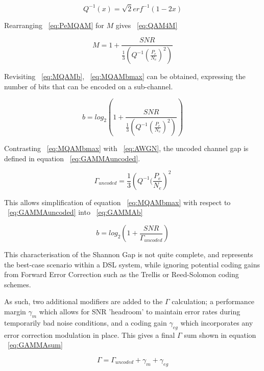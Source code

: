 \begin{equation}\label{eq:QxQAMerf2}
Q^{-1}(x)=\sqrt{2} erf^{-1}(1-2x)
\end{equation}

Rearranging ~\eqref{eq:PeMQAM} for \(M\) gives ~\eqref{eq:QAM4M}

\begin{equation}\label{eq:QAM4M}
M=1+\frac{SNR}{\frac{1}{3}(Q^{-1}(\frac{P_e}{N_e})^2)}
\end{equation}

Revisiting ~\eqref{eq:MQAMb}, ~\eqref{eq:MQAMbmax} can be obtained, expressing the number of bits that can be encoded on a sub-channel.

\begin{equation}\label{eq:MQAMbmax}
b=log_2\left(1+\frac{SNR}{\frac{1}{3}(Q^{-1}(\frac{P_e}{N_e})^2)}\right)
\end{equation}

Contrasting ~\eqref{eq:MQAMbmax} with ~\eqref{eq:AWGN}, the uncoded channel gap is defined in equation ~\eqref{eq:GAMMAuncoded}.

\begin{equation}\label{eq:GAMMAuncoded}
\Gamma_{uncoded}=\frac{1}{3}\left(Q^{-1}(\frac{P_e}{N_e}\right)^2
\end{equation}

This allows simplification of equation ~\eqref{eq:MQAMbmax} with respect to ~\eqref{eq:GAMMAuncoded} into ~\eqref{eq:GAMMAb}

\begin{equation}\label{eq:GAMMAb}
b=log_2\left(1+\frac{SNR}{\Gamma_{uncoded}}\right)
\end{equation}

This characterisation of the Shannon Gap is not quite complete, and represents the best-case scenario within a DSL system, while ignoring potential coding gains from Forward Error Correction such as the Trellis\cite{GU82} or Reed-Solomon\cite{Ree59} coding schemes.

As such, two additional modifiers are added to the \(\Gamma\) calculation; a performance margin \(\gamma_m\) which allows for SNR 'headroom' to maintain error rates during temporarily bad noise conditions, and a coding gain \(\gamma_{eg}\) which incorporates any error correction modulation in place. This gives a final \(\Gamma\) sum shown in equation ~\eqref{eq:GAMMAsum}

\begin{equation}\label{eq:GAMMAsum}
\Gamma=\Gamma_{uncoded}+\gamma_m+\gamma_{eg}
\end{equation}

